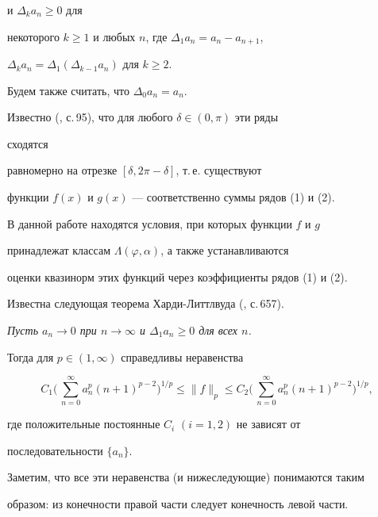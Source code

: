 и $\Delta_k a_n\ge 0$ для


некоторого $k\ge 1$ и любых $n$, где $\Delta_1a_n=a_n-a_{n+1}$,


$\Delta_k a_n=\Delta_1(\Delta_{k-1}a_n)$ для $k\ge 2$.


Будем также считать, что $\Delta_0a_n=a_n$.





Известно (\cite{1}, с.\,95), что для любого $\delta\in(0,\pi)$ эти ряды


сходятся


равномерно на отрезке $[\delta,2\pi-\delta]$, т.\,е. существуют


функции $f(x)$ и $g(x)$ --- соответственно суммы рядов (1) и (2).





В данной работе находятся условия, при которых функции $f$ и $g$


принадлежат классам $\Lambda(\varphi,\alpha)$, а также устанавливаются


оценки квазинорм этих функций через коэффициенты рядов (1) и (2).





Известна следующая теорема Харди-Литтлвуда (\cite{1}, с.\,657).


\medskip





{\it Пусть $a_n\to 0$ при $n\to\infty$ и $\Delta_1a_n\ge 0$ для всех $n$.


Тогда для $p\in(1,\infty)$ справедливы неравенства


$$


C_1\biggl(\,\sum^\infty_{n=0}a^p_n(n+1)^{p-2}\biggr)^{1/p}


\le \|f\|_p\le C_2\biggl(\,\sum^\infty_{n=0}a^p_n(n+1)^{p-2}


\biggr)^{1/p},


$$


где положительные постоянные $C_i$ $(i=1,2)$ не зависят от


последовательности $\{a_n\}$.


}


\medskip





Заметим, что все эти неравенства (и нижеследующие) понимаются таким


образом: из конечности правой части следует конечность левой части.





